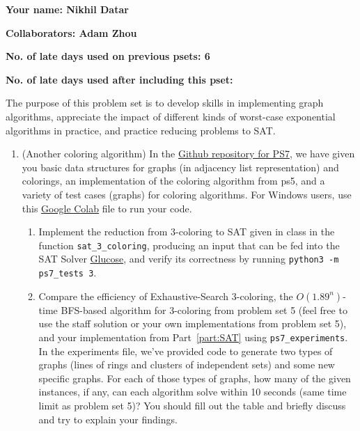 \documentclass[11pt]{article}
\begin{document}

\textbf{Your name: Nikhil Datar}

\textbf{Collaborators: Adam Zhou}

\textbf{No. of late days used on previous psets: 6}

\textbf{No. of late days used after including this pset: }


The purpose of this problem set is to develop skills in implementing graph algorithms, appreciate the impact of different kinds of worst-case exponential algorithms in practice, and practice reducing problems to SAT.
\begin{enumerate}

    \item (Another coloring algorithm) 
  In the \href{https://github.com/Harvard-CS-120/cs120/tree/main/fall2022/psets/ps7}{Github repository for PS7}, we have given you basic data structures for graphs (in adjacency list representation) and colorings, an implementation of the coloring algorithm from ps5, and a variety of test cases (graphs) for coloring algorithms. For Windows users, use this \href{https://colab.research.google.com/drive/13nMhNMaDstVaEkxye61m8AV7nk9ks9uS#scrollTo=AbIalcylVVuu}{Google Colab} file to run your code.
  
  \begin{enumerate}      
      \item Implement the reduction from 3-coloring to SAT given in class in the function \texttt{sat\_3\_coloring}, producing an input that can be fed into the SAT Solver \href{https://pysathq.github.io/usage/}{Glucose}, and verify its correctness by running \texttt{python3 -m ps7\_tests 3}. \label{part:SAT}
      \item Compare the efficiency of Exhaustive-Search 3-coloring, the $O(1.89^n)$-time BFS-based algorithm for 3-coloring from problem set 5 (feel free to use the staff solution or your own implementations from problem set 5), and your implementation from  Part~\ref{part:SAT} using \texttt{ps7\_experiments}. In the experiments file, we've provided code to generate two types of graphs (lines of rings and clusters of independent sets) and some new specific graphs. For each of those types of graphs, how many of the given instances, if any, can each algorithm solve within 10 seconds (same time limit as problem set 5)? You should fill out the table and briefly discuss and try to explain your findings.


\end{enumerate}
\end{enumerate}
\end{document}
